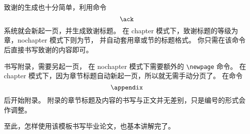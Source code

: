 致谢的生成也十分简单，利用命令 $$\verb|\ack|$$
系统就会新起一页，并生成致谢标题。
在 chapter 模式下，致谢标题的等级为章，nochapter 模式下则为节，
并自动套用章或节的标题格式。
你只需在该命令后直接书写致谢的内容即可。

书写附录，需要另起一页，
在 nochapter 模式下需要额外的 \verb|\newpage| 命令。
在 chapter 模式下，因为章节标题自动新起一页，所以就无需手动分页了。
在命令 $$\verb|\appendix|$$ 后开始附录。
附录的章节标题及内容的书写与正文并无差别，只是编号的形式会作调整。

至此，怎样使用该模板书写毕业论文，也基本讲解完了。